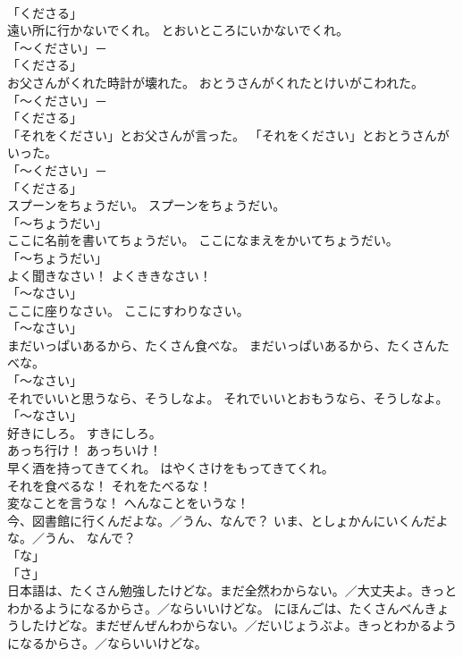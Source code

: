 \documentclass[8pt]{extreport}
\begin{document}
\begin{CJK}{UTF8}{min}
\\	「くださる」	
\\	遠い所に行かないでくれ。	とおいところにいかないでくれ。	
\\	「～ください」－ 
\\	「くださる」	
\\	お父さんがくれた時計が壊れた。	おとうさんがくれたとけいがこわれた。	
\\	「～ください」－ 
\\	「くださる」	
\\	「それをください」とお父さんが言った。	「それをください」とおとうさんがいった。	
\\	「～ください」－ 
\\	「くださる」	
\\	スプーンをちょうだい。	スプーンをちょうだい。	
\\	「～ちょうだい」 
\\	ここに名前を書いてちょうだい。	ここになまえをかいてちょうだい。	
\\	「～ちょうだい」 
\\	よく聞きなさい！	よくききなさい！	
\\	「～なさい」 
\\	ここに座りなさい。	ここにすわりなさい。	
\\	「～なさい」 
\\	まだいっぱいあるから、たくさん食べな。	まだいっぱいあるから、たくさんたべな。	
\\	「～なさい」 
\\	それでいいと思うなら、そうしなよ。	それでいいとおもうなら、そうしなよ。	
\\	「～なさい」 
\\	好きにしろ。	すきにしろ。	
\\	あっち行け！	あっちいけ！	
\\	早く酒を持ってきてくれ。	はやくさけをもってきてくれ。	
\\	それを食べるな！	それをたべるな！	
\\	変なことを言うな！	へんなことをいうな！	
\\	今、図書館に行くんだよな。／うん、なんで？	いま、としょかんにいくんだよな。／うん、 なんで？	
\\	「な」 
\\	「さ」	
\\	日本語は、たくさん勉強したけどな。まだ全然わからない。／大丈夫よ。きっとわかるようになるからさ。／ならいいけどな。	にほんごは、たくさんべんきょうしたけどな。まだぜんぜんわからない。／だいじょうぶよ。きっとわかるようになるからさ。／ならいいけどな。	

\end{CJK}
\end{document}
